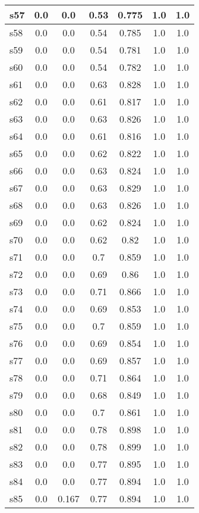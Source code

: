 \documentclass{article}
\begin{document}
\begin{tabular}{|l|c|c|c|c|c|c|}
\hline
s57 &0.0 & 0.0 & 0.53 & 0.775 & 1.0 & 1.0\\
\hline
s58 &0.0 & 0.0 & 0.54 & 0.785 & 1.0 & 1.0\\
\hline
s59 &0.0 & 0.0 & 0.54 & 0.781 & 1.0 & 1.0\\
\hline
s60 &0.0 & 0.0 & 0.54 & 0.782 & 1.0 & 1.0\\
\hline
s61 &0.0 & 0.0 & 0.63 & 0.828 & 1.0 & 1.0\\
\hline
s62 &0.0 & 0.0 & 0.61 & 0.817 & 1.0 & 1.0\\
\hline
s63 &0.0 & 0.0 & 0.63 & 0.826 & 1.0 & 1.0\\
\hline
s64 &0.0 & 0.0 & 0.61 & 0.816 & 1.0 & 1.0\\
\hline
s65 &0.0 & 0.0 & 0.62 & 0.822 & 1.0 & 1.0\\
\hline
s66 &0.0 & 0.0 & 0.63 & 0.824 & 1.0 & 1.0\\
\hline
s67 &0.0 & 0.0 & 0.63 & 0.829 & 1.0 & 1.0\\
\hline
s68 &0.0 & 0.0 & 0.63 & 0.826 & 1.0 & 1.0\\
\hline
s69 &0.0 & 0.0 & 0.62 & 0.824 & 1.0 & 1.0\\
\hline
s70 &0.0 & 0.0 & 0.62 & 0.82 & 1.0 & 1.0\\
\hline
s71 &0.0 & 0.0 & 0.7 & 0.859 & 1.0 & 1.0\\
\hline
s72 &0.0 & 0.0 & 0.69 & 0.86 & 1.0 & 1.0\\
\hline
s73 &0.0 & 0.0 & 0.71 & 0.866 & 1.0 & 1.0\\
\hline
s74 &0.0 & 0.0 & 0.69 & 0.853 & 1.0 & 1.0\\
\hline
s75 &0.0 & 0.0 & 0.7 & 0.859 & 1.0 & 1.0\\
\hline
s76 &0.0 & 0.0 & 0.69 & 0.854 & 1.0 & 1.0\\
\hline
s77 &0.0 & 0.0 & 0.69 & 0.857 & 1.0 & 1.0\\
\hline
s78 &0.0 & 0.0 & 0.71 & 0.864 & 1.0 & 1.0\\
\hline
s79 &0.0 & 0.0 & 0.68 & 0.849 & 1.0 & 1.0\\
\hline
s80 &0.0 & 0.0 & 0.7 & 0.861 & 1.0 & 1.0\\
\hline
s81 &0.0 & 0.0 & 0.78 & 0.898 & 1.0 & 1.0\\
\hline
s82 &0.0 & 0.0 & 0.78 & 0.899 & 1.0 & 1.0\\
\hline
s83 &0.0 & 0.0 & 0.77 & 0.895 & 1.0 & 1.0\\
\hline
s84 &0.0 & 0.0 & 0.77 & 0.894 & 1.0 & 1.0\\
\hline
s85 &0.0 & 0.167 & 0.77 & 0.894 & 1.0 & 1.0\\

\end{tabular}
\end{document}
